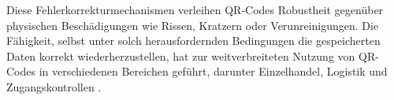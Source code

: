 Diese Fehlerkorrekturmechanismen verleihen QR-Codes Robustheit gegenüber physischen Beschädigungen wie Rissen, Kratzern oder Verunreinigungen. Die Fähigkeit, selbst unter solch herausfordernden Bedingungen die gespeicherten Daten korrekt wiederherzustellen, hat zur weitverbreiteten Nutzung von QR-Codes in verschiedenen Bereichen geführt, darunter Einzelhandel, Logistik und Zugangskontrollen \cite{QRCode2024}.